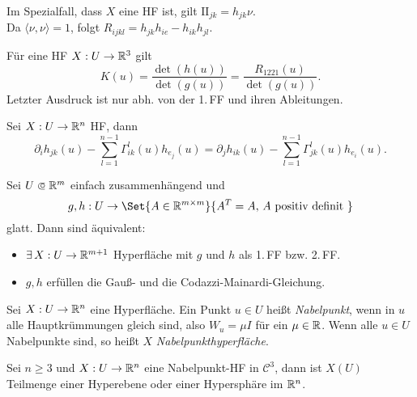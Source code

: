 \documentclass{cheat-sheet}
\newcommand{\FFII}{\mathrm{I\!I}} %
\begin{document}
\begin{bem}
  Im Spezialfall, dass $X$ eine HF ist, gilt $\FFII_{jk} = h_{jk} \nu$.\\
  Da $\langle \nu, \nu \rangle = 1$, folgt $R_{ijkl} = h_{jk} h_{ie} - h_{ik} h_{jl}$.
\end{bem}

\begin{satz}
  Für eine HF $X : U \to \mathbb{R}^3$ gilt
  \[ K(u) = \frac{\det(h(u))}{\det(g(u))} = \frac{R_{1221}(u)}{\det(g(u))}. \]
  Letzter Ausdruck ist nur abh. von der 1.\,FF und ihren Ableitungen.
\end{satz}


\begin{satz}
  Sei $X : U \to \mathbb{R}^n$ HF, dann
  \[ \partial_i h_{jk}(u) - \sum_{l=1}^{n-1} \Gamma_{ik}^l(u) h_{e_j}(u) = \partial_j h_{ik}(u) - \sum_{l=1}^{n-1} \Gamma_{jk}^l(u) h_{e_i}(u). \]
\end{satz}

\begin{satz}
  Sei $U \opn \R^m$ einfach zusammenhängend und
  \[ g, h : U \to \Set{ A \in \R^{m \times m} }{ A^T = A, \, A \text{ positiv definit } } \]
  glatt. Dann sind äquivalent:
  \begin{itemize}
    \item $\exists \, X : U \to \mathbb{R}^{m+1}$ Hyperfläche mit $g$ und $h$ als 1.\,FF bzw. 2.\,FF.
    \item $g, h$ erfüllen die Gauß- und die Codazzi-Mainardi-Gleichung.
  \end{itemize}
\end{satz}



\begin{defn}
  Sei $X : U \to \mathbb{R}^n$ eine Hyperfläche. Ein Punkt $u \in U$ heißt \emph{Nabelpunkt}, wenn in $u$ alle Hauptkrümmungen gleich sind, also $W_u = \mu I$ für ein $\mu \in \mathbb{R}$. Wenn alle $u \in U$ Nabelpunkte sind, so heißt $X$ \emph{Nabelpunkthyperfläche}.
\end{defn}

\begin{satz}
  Sei $n \geq 3$ und $X : U \to \mathbb{R}^n$ eine Nabelpunkt-HF in $\mathcal{C}^3$, dann ist $X(U)$ Teilmenge einer Hyperebene oder einer Hypersphäre im $\mathbb{R}^n$.
\end{satz}
\end{document}

